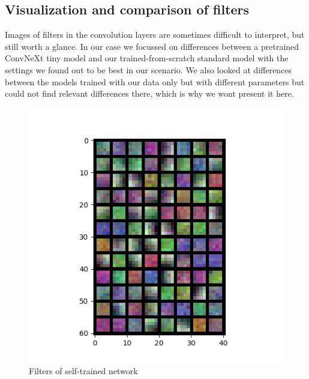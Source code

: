 \documentclass{article}
\begin{document}
\subsection{Visualization and comparison of filters}\label{subsec:filter-images}
Images of filters in the convolution layers are sometimes difficult to interpret, but still worth a glance.
In our case we focussed on differences between a pretrained ConvNeXt tiny model and our trained-from-scratch standard model with the settings we found out to be best in our scenario.
We also looked at differences between the models trained with our data only but with different parameters but could not find relevant differences there, which is why we wont present it here.
\begin{figure}[!tbp]
    \centering
    \begin{minipage}[b]{0.49\textwidth}
        \includegraphics[width=\textwidth]{images/filters_layer0_from_scratch.png}
        \caption{Filters of self-trained network}
    \end{minipage}
    \hfill
    \begin{minipage}[b]{0.49\textwidth}

\end{minipage}
\end{figure}
\end{document}
